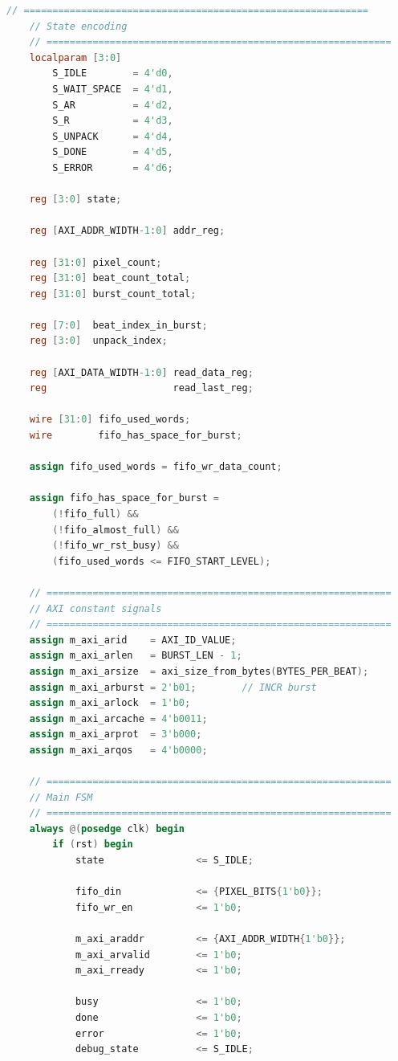 \begin{lstlisting}[language=Verilog, title={Kode \emph{AXI Read} Yang akan mengisi \emph{FIFO VGA}}, label={code:verilog-axi-read}]
    // ============================================================
    // State encoding
    // ============================================================
    localparam [3:0]
        S_IDLE        = 4'd0,
        S_WAIT_SPACE  = 4'd1,
        S_AR          = 4'd2,
        S_R           = 4'd3,
        S_UNPACK      = 4'd4,
        S_DONE        = 4'd5,
        S_ERROR       = 4'd6;

    reg [3:0] state;

    reg [AXI_ADDR_WIDTH-1:0] addr_reg;

    reg [31:0] pixel_count;
    reg [31:0] beat_count_total;
    reg [31:0] burst_count_total;

    reg [7:0]  beat_index_in_burst;
    reg [3:0]  unpack_index;

    reg [AXI_DATA_WIDTH-1:0] read_data_reg;
    reg                      read_last_reg;

    wire [31:0] fifo_used_words;
    wire        fifo_has_space_for_burst;

    assign fifo_used_words = fifo_wr_data_count;

    assign fifo_has_space_for_burst =
        (!fifo_full) &&
        (!fifo_almost_full) &&
        (!fifo_wr_rst_busy) &&
        (fifo_used_words <= FIFO_START_LEVEL);

    // ============================================================
    // AXI constant signals
    // ============================================================
    assign m_axi_arid    = AXI_ID_VALUE;
    assign m_axi_arlen   = BURST_LEN - 1;
    assign m_axi_arsize  = axi_size_from_bytes(BYTES_PER_BEAT);
    assign m_axi_arburst = 2'b01;        // INCR burst
    assign m_axi_arlock  = 1'b0;
    assign m_axi_arcache = 4'b0011;
    assign m_axi_arprot  = 3'b000;
    assign m_axi_arqos   = 4'b0000;

    // ============================================================
    // Main FSM
    // ============================================================
    always @(posedge clk) begin
        if (rst) begin
            state                <= S_IDLE;

            fifo_din             <= {PIXEL_BITS{1'b0}};
            fifo_wr_en           <= 1'b0;

            m_axi_araddr         <= {AXI_ADDR_WIDTH{1'b0}};
            m_axi_arvalid        <= 1'b0;
            m_axi_rready         <= 1'b0;

            busy                 <= 1'b0;
            done                 <= 1'b0;
            error                <= 1'b0;
            debug_state          <= S_IDLE;


\end{lstlisting}
